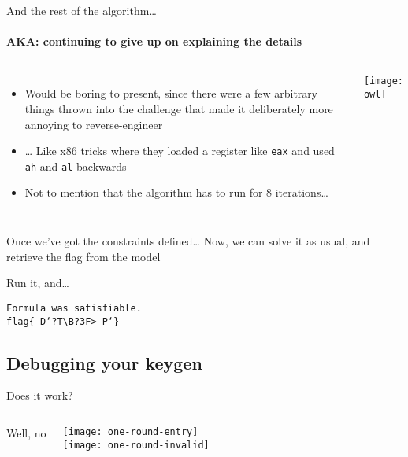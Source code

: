 \begin{frame}{And the rest of the algorithm\ldots}
    \framesubtitle{AKA: continuing to give up on explaining the details}
    \begin{columns}

        \begin{itemize}
            \item Would be boring to present, since there were a few arbitrary
                  things thrown into the challenge that made it deliberately
                  more annoying to reverse-engineer
            \item \ldots\xspace Like x86 tricks where they loaded a register
                  like \texttt{eax} and used \texttt{ah} and \texttt{al}
                  backwards
            \item Not to mention that the algorithm has to run for 8
                  iterations\ldots
        \end{itemize}
        \texttt{[image: owl]}
    \end{columns}
\end{frame}

\begin{frame}{Once we've got the constraints defined\ldots}
    Now, we can solve it as usual, and retrieve the flag from the model \\
    \pause
\end{frame}

\begin{frame}{Run it, and\ldots}
    \begin{center}
        {\Large
            \texttt{Formula was satisfiable.} \\
            \texttt{flag\{ D`?T\textbackslash{}B?3F>~P`\}}
        }
    \end{center}
\end{frame}

\subsection{Debugging your keygen}

\begin{frame}{Does it work?}
    \begin{columns}
        Well, no

        \texttt{[image: one-round-entry]} \\
        \texttt{[image: one-round-invalid]}
    \end{columns}
\end{frame}

